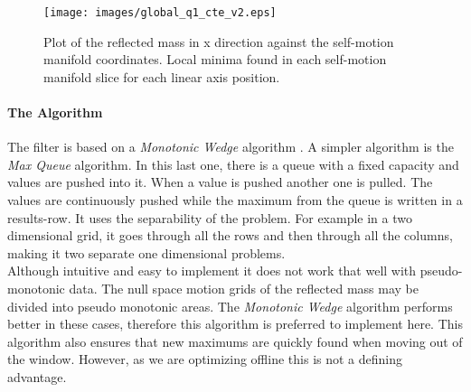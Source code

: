 \begin{figure}[htb]
	\centerline{
 		\texttt{[image: images/global\_q1\_cte\_v2.eps]}}
	\caption{ Plot of the reflected mass in x direction against the self-motion
		manifold coordinates. Local minima found in each self-motion manifold slice for each linear axis position. }
	\label{fig:maxminfilter2}
\end{figure}





\paragraph{The Algorithm}
\label{subsec:global_alg}

The filter is based on a \textit{Monotonic Wedge} algorithm \cite{Lemire}.
A simpler algorithm is the \textit{Max Queue} algorithm. In this last one, there is a queue with a fixed capacity and values are pushed into it. When a value is pushed another one is pulled. The values are continuously pushed while the maximum from the queue is written in a results-row.
It uses the separability of the problem.  For example in a two dimensional grid, it goes through all the rows and then through all the columns, making it two separate one dimensional problems.\\
%
Although intuitive and easy to implement it does not work that well with pseudo-monotonic data. The null space motion grids of the reflected mass may be divided into pseudo monotonic areas. The \textit{Monotonic Wedge} algorithm performs better in these cases, therefore this algorithm is preferred to implement here. This algorithm also ensures that new maximums are quickly found when moving out of the window. However, as we are optimizing offline this is not a defining advantage.





